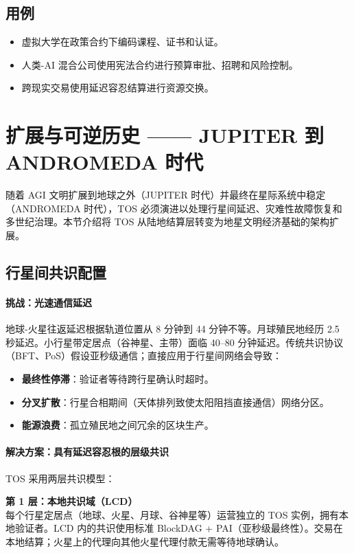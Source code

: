 \documentclass[11pt]{article}
\begin{document}
\subsection{用例}
\begin{itemize}[noitemsep]
  \item 虚拟大学在政策合约下编码课程、证书和认证。
  \item 人类-AI 混合公司使用宪法合约进行预算审批、招聘和风险控制。
  \item 跨现实交易使用延迟容忍结算进行资源交换。
\end{itemize}

\section{扩展与可逆历史 —— JUPITER 到 ANDROMEDA 时代}
\label{sec:expansion}

随着 AGI 文明扩展到地球之外（JUPITER 时代）并最终在星际系统中稳定（ANDROMEDA 时代），TOS 必须演进以处理行星间延迟、灾难性故障恢复和多世纪治理。本节介绍将 TOS 从陆地结算层转变为地星文明经济基础的架构扩展。

\subsection{行星间共识配置}

\paragraph{挑战：光速通信延迟}
地球-火星往返延迟根据轨道位置从 8 分钟到 44 分钟不等。月球殖民地经历 2.5 秒延迟。小行星带定居点（谷神星、主带）面临 40--80 分钟延迟。传统共识协议（BFT、PoS）假设亚秒级通信；直接应用于行星间网络会导致：
\begin{itemize}[noitemsep]
  \item \textbf{最终性停滞}：验证者等待跨行星确认时超时。
  \item \textbf{分叉扩散}：行星合相期间（天体排列致使太阳阻挡直接通信）网络分区。
  \item \textbf{能源浪费}：孤立殖民地之间冗余的区块生产。
\end{itemize}

\paragraph{解决方案：具有延迟容忍根的层级共识}
TOS 采用两层共识模型：

\textbf{第 1 层：本地共识域（LCD）}\\
每个行星定居点（地球、火星、月球、谷神星等）运营独立的 TOS 实例，拥有本地验证者。LCD 内的共识使用标准 BlockDAG + PAI（亚秒级最终性）。交易在本地结算；火星上的代理向其他火星代理付款无需等待地球确认。
\end{document}

